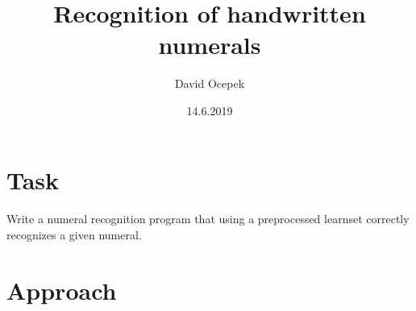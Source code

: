 \documentclass{article}
\title{Recognition of handwritten numerals}
\date{14.6.2019}
\author{David Ocepek}
\begin{document}
	\maketitle
  	
	\section{Task}
	\paragraph{}
	Write a numeral recognition program that using a preprocessed learnset correctly recognizes a given numeral.

	\section{Approach}
\end{document}
